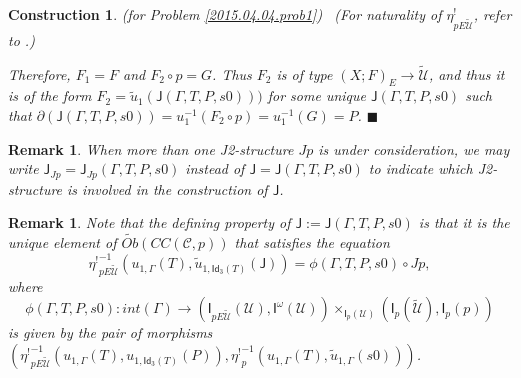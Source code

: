 \documentclass[12pt]{article}
\numberwithin{equation}{section}
\newtheorem{remark}[proposition]{Remark}
\newtheorem{construction0}[proposition]{Construction}
\newenvironment{construction}[1]{\begin{construction0}(for Problem \ref{#1})\ }{$\blacksquare$ \end{construction0}}
\newcommand{\sr}{\rightarrow}
\newcommand{\wt}{\widetilde}
\newcommand{\toCC}{CC} %
\newcommand{\C}{{\mathcal C}}  %
\newcommand{\Idx}{\mathsf{Id}_3} %
\newcommand{\J}{\mathsf{J}}
\newcommand{\U}{\mathcal{U}}
\newcommand{\I}{\mathsf{I}}
\newcommand{\etashriek}{\eta^!}
\newcommand{\etaunshriek}{{\etashriek}^{-1}}
\newcommand{\Obwt}{\wt{Ob}}
\begin{document}
\begin{construction}{2015.04.04.prob1}
(For naturality of $\etashriek_{pE\wt{\U}}$, refer to \cite[Problem 3.8(1)]{fromunivwithPi}.)

Therefore, $F_1 = F$ and $F_2 \circ p = G$.
Thus $F_2$ is of type $(X;F)_E\sr \wt{\U}$, and thus it is of the form
$F_2 = \wt{u}_{1}(\J(\Gamma,T,P,s0)))$ for some unique $\J(\Gamma,T,P,s0)$ such that $\partial(\J(\Gamma,T,P,s0)) = u_1^{-1}(F_2 \circ p)= u_1^{-1}(G) = P$.
\end{construction}

\begin{remark}
  When more than one J2-structure $Jp$ is under consideration, we may write $\J_{Jp} = \J_{Jp}(\Gamma,T,P,s0)$ instead of $\J = \J(\Gamma,T,P,s0)$
  to indicate which J2-structure is involved in the construction of $\J$.
\end{remark}

\begin{remark}\rm
\label{2015.05.08.rem1} Note that the defining property of
$\J := \J(\Gamma,T,P,s0)$ is that it is the unique element of
$\Obwt(\toCC({\C},p))$ that satisfies the equation
%
$$\etaunshriek_{pE\wt{\U}}(u_{1,\Gamma}(T),\wt{u}_{1,\Idx(T)}(\J))=\phi(\Gamma,T,P,s0)\circ
Jp,$$
%
where
%
$$\phi(\Gamma,T,P,s0):int(\Gamma)\sr
(\I_{pE\wt{\U}}(\U),\I^{\omega}(\U))\times_{\I_p(\U)}(\I_p(\wt{\U}),\I_p(p))$$
%
is given by the pair of morphisms $(\etaunshriek_{pE\wt{\U}}(u_{1,\Gamma}(T),
u_{1,\Idx(T)}(P)), \etaunshriek_p(u_{1,\Gamma}(T),\wt{u}_{1,\Gamma}(s0)))$.
\end{remark}
%
\end{document}
